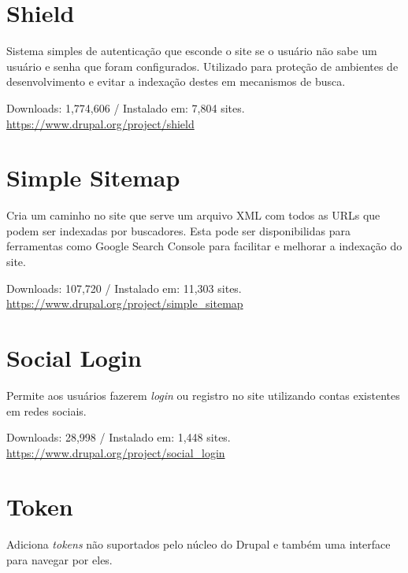 \section{Shield}
Sistema simples de autenticação que esconde o site se o usuário não sabe um usuário e senha que foram configurados. Utilizado para proteção de ambientes de desenvolvimento e evitar a indexação destes em mecanismos de busca.

\begin{center}
  Downloads: 1,774,606 / Instalado em: 7,804 sites. \\
  \url{https://www.drupal.org/project/shield}
\end{center}

\section{Simple Sitemap}
Cria um caminho no site que serve um arquivo XML com todos as URLs que podem ser indexadas por buscadores. Esta pode ser disponibilidas para ferramentas como Google Search Console para facilitar e melhorar a indexação do site.

\begin{center}
  Downloads: 107,720 / Instalado em: 11,303 sites. \\
  \url{https://www.drupal.org/project/simple_sitemap}
\end{center}

\section{Social Login}
Permite aos usuários fazerem \textit{login} ou registro no site utilizando contas existentes em redes sociais.

\begin{center}
  Downloads: 28,998 / Instalado em: 1,448 sites. \\
  \url{https://www.drupal.org/project/social_login}
\end{center}

\section{Token}
Adiciona \textit{tokens} não suportados pelo núcleo do Drupal e também uma interface para navegar por eles.

